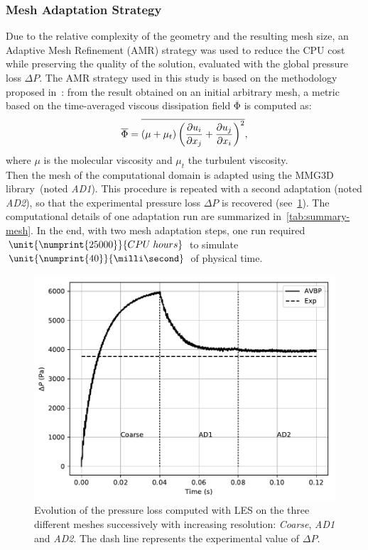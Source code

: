 \subsubsection{Mesh Adaptation Strategy}
Due to the relative complexity of the geometry and the resulting mesh size, an Adaptive Mesh Refinement (AMR) strategy was used to reduce the CPU cost while preserving the quality of the solution, evaluated with the global pressure loss $\Delta P$. The AMR strategy used in this study is based on the methodology proposed in~\cite{Daviller2017}: from the result obtained on an initial arbitrary mesh, a metric based on the time-averaged viscous dissipation field $\mathrm{\overline{\Phi}}$ is computed as: 
\begin{equation}\label{eq:phi}
\mathrm{\overline{\Phi}} = \overline {( \mu + \mu_t) \left(\frac{\partial{u_i}}{\partial{x_j}} + \frac{\partial{u_j}}{\partial{x_i}}\right)^2 },
\end{equation}
where $\mu$ is the molecular viscosity and $\mu_t$ the turbulent viscosity.\\
Then the mesh of the computational domain is adapted using the MMG3D library~\cite{Dapogny2014358}(noted \emph{AD1}). This procedure is repeated with a second adaptation (noted \emph{AD2}), so that the experimental pressure loss $\Delta P$ is recovered (see~\cref{pressure_drop_evolution}). The computational details of one adaptation run are summarized in~\cref{tab:summary-mesh}. In the end, with two mesh adaptation steps, one run required $\unit{\numprint{25000}}{CPU\;hours}$ to simulate $\unit{\numprint{40}}{\milli\second}$ of physical time.

\begin{figure}[!ht]
\centering
\includegraphics[width=\linewidth,keepaspectratio]{fig/applications/swirler/losses_swirler_base.pdf}
\caption{Evolution of the pressure loss computed with LES on the three different meshes successively with increasing resolution: \emph{Coarse}, \emph{AD1} and \emph{AD2}. The dash line represents the experimental value of $\Delta P$.}
\label{pressure_drop_evolution}
\end{figure}

